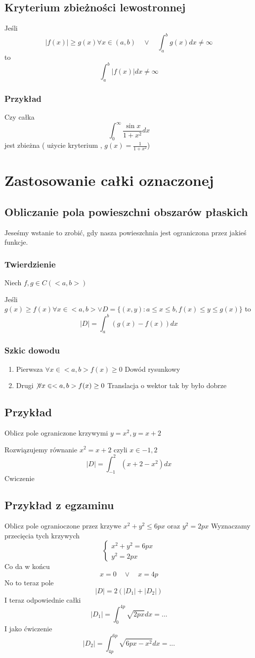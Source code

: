 \documentclass[11pt]{article}
\begin{document}
\subsection{Kryterium zbieżności lewostronnej}
Jeśli
$$|f(x)| \geq g(x) \forall x \in (a,b) \quad \vee \quad \int_a^b g(x)dx \not= \infty $$ 
to $$\int_a^b |f(x)|dx  \not = \infty$$
\subsubsection{Przykład}
Czy całka 
$$\int_0^\infty \frac{\sin{x}}{1+x^2}dx $$
jest zbieżna ( użycie kryterium , $g(x) = \frac{1}{1+x^2}$)
\section{Zastosowanie całki oznaczonej}
\subsection{Obliczanie pola powieszchni obszarów płaskich}
Jeseśmy wstanie to zrobić, gdy nasza powieszchnia jest ograniczona przez jakieś funkcje.
\subsubsection{Twierdzienie}
Niech $f,g \in C(<a,b>)$

Jeśli $g(x) \geq f(x) \forall x \in <a,b> \vee D = \{(x,y) : a \leq x \leq b, f(x) \leq y \leq g(x)\} $
to
$$|D| = \int_a^b (g(x)-f(x))dx $$
\subsubsection{Szkic dowodu}
\begin{enumerate}
\item{Pierwsza $\forall x \in <a,b> f(x) \geq 0$}
Dowód rysunkowy
\item{Drugi $\not \forall x \in <a,b> f(x) \geq 0$}
Translacja o wektor tak by było dobrze
\end{enumerate}
\subsection{Przykład}
Oblicz pole ograniczone krzywymi $ y = x^2 , y = x+2$

Rozwiązujemy równanie $ x^2 = x+2 $ czyli $ x\in {-1,2}$
$$|D| = \int_{-1}^{2} (x+2 -x^2)dx $$
Cwiczenie

\subsection{Przykład z egzaminu}
Oblicz pole ogranioczone przez krzywe $x^2 + y^2 \leq 6px $ oraz $ y^2 = 2px $
Wyznaczamy przecięcia tych krzywych
\begin{displaymath}
\begin{cases}
x^2 + y^2 = 6px \\
y^2 = 2px 
\end{cases}
\end{displaymath}
Co da w końcu 
$$ x = 0 \quad \vee \quad x = 4p $$
No to teraz pole
$$ |D| = 2( |D_1| + |D_2| )$$
I teraz odpowiednie całki
$$ |D_1| = \int_0^{4p} \sqrt{2px}dx = ...$$
I jako ćwiczenie
$$ |D_2| = \int_{4p}^{6p} \sqrt{6px - x^2} dx = ...$$
\end{document}
